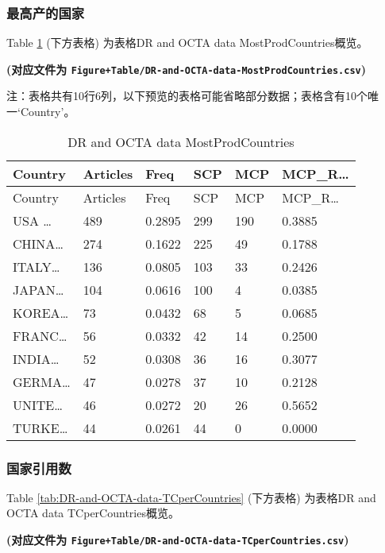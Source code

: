 \documentclass[
]{article}
\begin{document}
\hypertarget{ux6700ux9ad8ux4ea7ux7684ux56fdux5bb6}{%
\subsubsection{最高产的国家}\label{ux6700ux9ad8ux4ea7ux7684ux56fdux5bb6}}

Table \ref{tab:DR-and-OCTA-data-MostProdCountries} (下方表格) 为表格DR and OCTA data MostProdCountries概览。

\textbf{(对应文件为 \texttt{Figure+Table/DR-and-OCTA-data-MostProdCountries.csv})}

\begin{center}\begin{tcolorbox}[colback=gray!10, colframe=gray!50, width=0.9\linewidth, arc=1mm, boxrule=0.5pt]注：表格共有10行6列，以下预览的表格可能省略部分数据；表格含有10个唯一`Country'。
\end{tcolorbox}
\end{center}

\begin{longtable}[]{@{}llllll@{}}
\caption{\label{tab:DR-and-OCTA-data-MostProdCountries}DR and OCTA data MostProdCountries}\tabularnewline
\toprule
Country & Articles & Freq & SCP & MCP & MCP\_R\ldots{}\tabularnewline
\midrule
\endfirsthead
\toprule
Country & Articles & Freq & SCP & MCP & MCP\_R\ldots{}\tabularnewline
\midrule
\endhead
USA \ldots{} & 489 & 0.2895 & 299 & 190 & 0.3885\tabularnewline
CHINA\ldots{} & 274 & 0.1622 & 225 & 49 & 0.1788\tabularnewline
ITALY\ldots{} & 136 & 0.0805 & 103 & 33 & 0.2426\tabularnewline
JAPAN\ldots{} & 104 & 0.0616 & 100 & 4 & 0.0385\tabularnewline
KOREA\ldots{} & 73 & 0.0432 & 68 & 5 & 0.0685\tabularnewline
FRANC\ldots{} & 56 & 0.0332 & 42 & 14 & 0.2500\tabularnewline
INDIA\ldots{} & 52 & 0.0308 & 36 & 16 & 0.3077\tabularnewline
GERMA\ldots{} & 47 & 0.0278 & 37 & 10 & 0.2128\tabularnewline
UNITE\ldots{} & 46 & 0.0272 & 20 & 26 & 0.5652\tabularnewline
TURKE\ldots{} & 44 & 0.0261 & 44 & 0 & 0.0000\tabularnewline
\bottomrule
\end{longtable}

\hypertarget{ux56fdux5bb6ux5f15ux7528ux6570}{%
\subsubsection{国家引用数}\label{ux56fdux5bb6ux5f15ux7528ux6570}}

Table \ref{tab:DR-and-OCTA-data-TCperCountries} (下方表格) 为表格DR and OCTA data TCperCountries概览。

\textbf{(对应文件为 \texttt{Figure+Table/DR-and-OCTA-data-TCperCountries.csv})}
\end{document}
